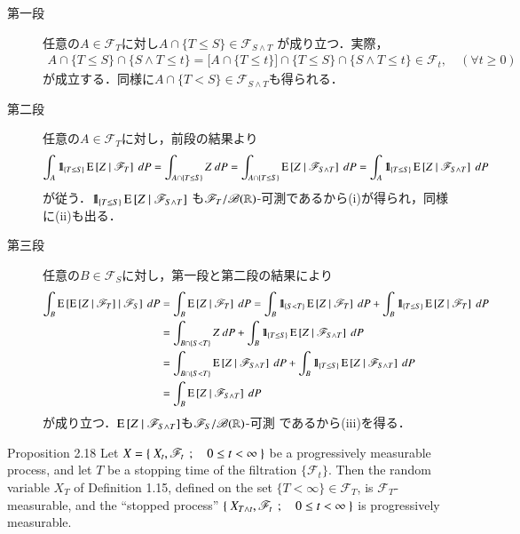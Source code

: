 	\begin{prf}\mbox{}
		\begin{description}
			\item[第一段]
				任意の$A \in \mathscr{F}_T$に対し$A \cap \{T \leq S\} \in \mathscr{F}_{S \wedge T}$
				が成り立つ．実際，
				\begin{align}
					A \cap \{T \leq S\} \cap \{S \wedge T \leq t\}
					= \biggl[ A \cap \{T \leq t\} \biggr] \cap \{T \leq S\} \cap \{S \wedge T \leq t\}
					\in \mathscr{F}_t,
					\quad (\forall t \geq 0)
				\end{align}
				が成立する．同様に$A \cap \{T < S\} \in \mathscr{F}_{S \wedge T}$も得られる．
				
			\item[第二段]
				任意の$A \in \mathscr{F}_T$に対し，前段の結果より
				\begin{align}
					\int_A \mbox{1}\hspace{-0.25em}\mbox{l}_{\{T \leq S\}} \operatorname{E} \left[ Z \ \middle|\ \mathscr{F}_T \right]\ dP
					= \int_{A \cap \{T \leq S\}} Z\ dP
					= \int_{A \cap \{T \leq S\}} \operatorname{E} \left[ Z \ \middle|\ \mathscr{F}_{S \wedge T} \right]\ dP
					= \int_A \mbox{1}\hspace{-0.25em}\mbox{l}_{\{T \leq S\}} \operatorname{E} \left[ Z \ \middle|\ \mathscr{F}_{S \wedge T} \right]\ dP
				\end{align}
				が従う．$\mbox{1}\hspace{-0.25em}\mbox{l}_{\{T \leq S\}} \operatorname{E} \left[ Z \ \middle|\ \mathscr{F}_{S \wedge T} \right]$
				も$\mathscr{F}_T/\mathscr{B}(\mathbb{R})$-可測であるから(i)が得られ，同様に(ii)も出る．
			
			\item[第三段]
				任意の$B \in \mathscr{F}_S$に対し，第一段と第二段の結果により
				\begin{align}
					\int_B \operatorname{E} \left[ \operatorname{E} \left[ Z \ \middle|\ \mathscr{F}_T \right] \ \middle|\ \mathscr{F}_S \right]\ dP
					&= \int_B \operatorname{E} \left[ Z \ \middle|\ \mathscr{F}_T \right]\ dP
					= \int_B \mbox{1}\hspace{-0.25em}\mbox{l}_{\{S < T\}} \operatorname{E} \left[ Z \ \middle|\ \mathscr{F}_T \right]\ dP
						+ \int_B \mbox{1}\hspace{-0.25em}\mbox{l}_{\{T \leq S\}} \operatorname{E} \left[ Z \ \middle|\ \mathscr{F}_T \right]\ dP \\
					&= \int_{B \cap \{S < T\}} Z\ dP
						+ \int_B \mbox{1}\hspace{-0.25em}\mbox{l}_{\{T \leq S\}} \operatorname{E} \left[ Z \ \middle|\ \mathscr{F}_{S \wedge T} \right]\ dP \\
					&= \int_{B \cap \{S < T\}} \operatorname{E} \left[ Z \ \middle|\ \mathscr{F}_{S \wedge T} \right]\ dP
						+ \int_B \mbox{1}\hspace{-0.25em}\mbox{l}_{\{T \leq S\}} \operatorname{E} \left[ Z \ \middle|\ \mathscr{F}_{S \wedge T} \right]\ dP \\
					&= \int_B \operatorname{E} \left[ Z \ \middle|\ \mathscr{F}_{S \wedge T} \right]\ dP
				\end{align}
				が成り立つ．$\operatorname{E} \left[ Z \ \middle|\ \mathscr{F}_{S \wedge T} \right]$も$\mathscr{F}_S/\mathscr{B}(\mathbb{R})$-可測
				であるから(iii)を得る．
				\QED
		\end{description}
	\end{prf}
	
	\begin{itembox}[l]{Proposition 2.18}
		Let $X = \left\{\ X_t,\mathscr{F}_t\ \, ; \quad 0 \leq t < \infty\ \right\}$ be a progressively measurable 
		process, and let $T$ be a stopping time of the filtration $\{\mathscr{F}_t\}$. 
		Then the random variable $X_T$ of Definition 1.15, defined on the set 
		$\{T < \infty\} \in \mathscr{F}_T$, is $\mathscr{F}_T$-measurable, and
		the ``stopped process'' $\left\{\ X_{T \wedge t},\mathscr{F}_t\ \, ; \quad 0 \leq t < \infty\ \right\}$
		is progressively measurable.
	\end{itembox}
	
